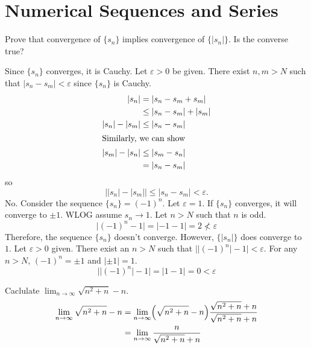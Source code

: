 \chapter{Numerical Sequences and Series}
\label{ch3}

\begin{exercise}
\item
  Prove that convergence of \(\{s_n\}\) implies convergence of
  \(\{\lvert s_n\rvert\}\).
  Is the converse true?
  \par\smallskip
  Since \(\{s_n\}\) converges, it is Cauchy.
  Let \(\varepsilon > 0\) be given.
  There exist \(n,m > N\) such that \(\lvert s_n - s_m\rvert < \varepsilon\) since
  \(\{s_n\}\) is Cauchy.
  \begin{align*}
    \lvert s_n\rvert & = \lvert s_n - s_m + s_m\rvert\\
                     & \leq \lvert s_n - s_m\rvert + \lvert s_m\rvert\\
    \lvert s_n\rvert - \lvert s_m\rvert & \leq \lvert s_n - s_m\rvert\\
    \intertext{Similarly, we can show}
    \lvert s_m\rvert - \lvert s_n\rvert & \leq \lvert s_m - s_n\rvert\\
                     & = \lvert s_n - s_m\rvert
  \end{align*}
  so
  \[
  \bigl\lvert\lvert s_n\rvert - \lvert s_m\rvert\bigr\rvert\leq
  \lvert s_n - s_m\rvert < \varepsilon.
  \]
  No.
  Consider the sequence \(\{s_n\} = (-1)^n\).
  Let \(\varepsilon = 1\).
  If \(\{s_n\}\) converges, it will converge to \(\pm 1\).
  WLOG assume \(s_n\to 1\).
  Let \(n > N\) such that \(n\) is odd.
  \[
  \lvert (-1)^n - 1\rvert = \lvert -1 - 1\rvert = 2\not < \varepsilon
  \]
  Therefore, the sequence \(\{s_n\}\) doesn't converge.
  However, \(\{\lvert s_n\rvert\}\) does converge to \(1\).
  Let \(\varepsilon > 0\) given.
  There exist an \(n > N\) such that
  \(\bigl\lvert\lvert (-1)^n\rvert - 1\bigr\rvert < \varepsilon\).
  For any \(n > N\), \((-1)^n = \pm 1\) and \(\lvert \pm 1\rvert = 1\).
  \[
  \bigl\lvert\lvert (-1)^n\rvert - 1\bigr\rvert =
  \lvert 1 - 1\rvert = 0 < \varepsilon
  \]
\item
  Caclulate \(\lim_{n\to\infty}\sqrt{n^2 + n} - n\).
  \begin{align*}
    \lim_{n\to\infty}\sqrt{n^2 + n} - n
    & = \lim_{n\to\infty}\Bigl(\sqrt{n^2 + n} - n\Bigr)
      \frac{\sqrt{n^2 + n} + n}{\sqrt{n^2 + n} + n}\\
    & = \lim_{n\to\infty}\frac{n}{\sqrt{n^2 + n} + n}\\

\end{align*}
\end{exercise}
